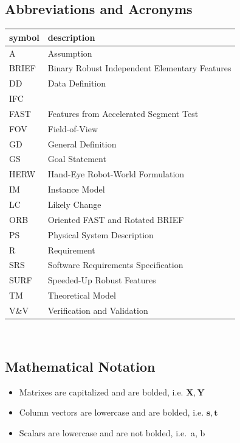 \documentclass[12pt]{article}
\begin{document}
\subsection{Abbreviations and Acronyms}

\renewcommand{\arraystretch}{1.2}
\begin{tabular}{l l} 
  \toprule		
  \textbf{symbol} & \textbf{description}\\
  \midrule 
  A & Assumption\\
  BRIEF & Binary Robust Independent Elementary Features\\ 
  DD & Data Definition\\
  IFC & \progname{}\\
  FAST & Features from Accelerated Segment Test\\
  FOV & Field-of-View\\
  GD & General Definition\\
  GS & Goal Statement\\
  HERW  & Hand-Eye Robot-World Formulation \\
  IM & Instance Model\\
  LC & Likely Change\\
  ORB & Oriented FAST and Rotated BRIEF\\
  PS & Physical System Description\\
  R & Requirement\\
  SRS & Software Requirements Specification\\
  SURF & Speeded-Up Robust Features\\
  TM & Theoretical Model\\
  V\&V & Verification and Validation\\
  \bottomrule
\end{tabular}\\


\subsection{Mathematical Notation}

\begin{itemize}
  \item Matrixes are capitalized and are bolded, i.e. $\mathbf{X, Y}$
  \item Column vectors are lowercase and are bolded, i.e. $\mathbf{s, t}$
  \item Scalars are lowercase and are not bolded, i.e.\ a, b
\end{itemize}
\end{document}
